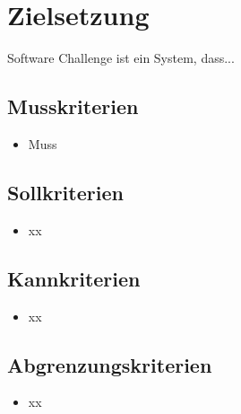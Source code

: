 \section{Zielsetzung}
Software Challenge ist ein System, dass...

\subsection{Musskriterien}

\begin{itemize}
	\item Muss
\end{itemize}

\subsection{Sollkriterien}
\begin{itemize}
	\item xx
\end{itemize}

\subsection{Kannkriterien}
\begin{itemize}
	\item xx
\end{itemize}

\subsection{Abgrenzungskriterien}
\begin{itemize}
	\item xx
\end{itemize}

